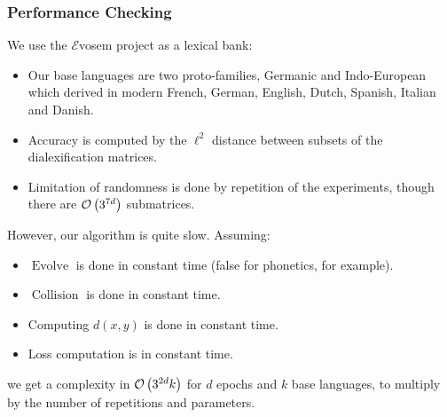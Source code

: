 \documentclass[ratio=169]{beamercours}
\DeclareMathOperator{\revo}{Evolve}
\DeclareMathOperator{\coll}{Collision}
\begin{document}
\begin{frame}[allowframebreaks]
	\frametitle{Performance Checking}
	We use the $\mathcal{E}$vosem project \cite{evosem} as a lexical bank:
	\begin{itemize}
		\item Our base languages are two proto-families, Germanic and Indo-European which
derived in modern French, German, English, Dutch, Spanish, Italian and Danish.
		\item Accuracy is computed by the $\ell^{2}$ distance between subsets of the dialexification matrices.
		\item Limitation of randomness is done by repetition of the experiments, though there are $\mathcal{O}\left( 3^{7d} \right)$ submatrices.
	\end{itemize}

	\framebreak

	However, our algorithm is quite slow. Assuming:
	\begin{itemize}
		\item $\revo$ is done in constant time (false for phonetics, for example).
		\item $\coll$ is done in constant time.
		\item Computing $d\left( x, y \right)$ is done in constant time.
		\item Loss computation is in constant time.
	\end{itemize}
	we get a complexity in $\mathcal{O}\left( 3^{2d}k \right)$ for $d$ epochs and $k$ base languages, to multiply by the number of repetitions and parameters.
\end{frame}
\end{document}
